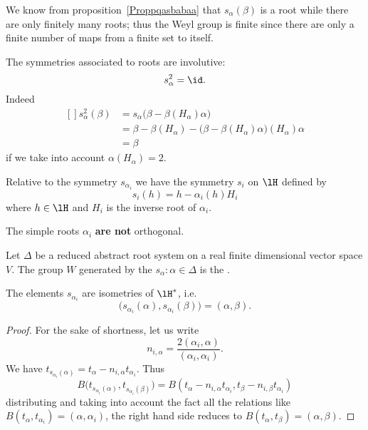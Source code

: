We know from proposition~\ref{Proppqasbabaa} that \( s_{\alpha}(\beta)\) is a root while there are only finitely many roots; thus the Weyl group is finite since there are only a finite number of maps from a finite set to itself.

The symmetries associated to roots are involutive:
\begin{equation}
	s_{\alpha}^2=\id.
\end{equation}
Indeed
\begin{equation}
	\begin{aligned}[]
		s^2_{\alpha}(\beta) & =s_{\alpha}\big( \beta-\beta(H_{\alpha})\alpha \big)                                 \\
		                    & =\beta-\beta(H_{\alpha})-\big( \beta-\beta(H_{\alpha})\alpha \big)(H_{\alpha})\alpha \\
		                    & =\beta
	\end{aligned}
\end{equation}
if we take into account \( \alpha(H_{\alpha})=2\).

Relative to the symmetry \( s_{\alpha_i}\) we have the symmetry \( s_i\) on \( \lH\) defined by
\begin{equation}        \label{EqSymsiReltosalphai}
	s_i(h)=h-\alpha_i(h)H_i
\end{equation}
where \( h\in\lH\) and \( H_i\) is the inverse root of \( \alpha_i\).

\begin{remark}
	The simple roots \( \alpha_i\) {\bf are not} orthogonal.
\end{remark}

Let $\Delta$ be a reduced abstract root system on a real finite dimensional vector space $V$. The group $W$ generated by the $s_{\alpha}:\alpha\in\Delta$ is the .

\begin{proposition}     \label{PropWeylIsomalphai}
	The elements \( s_{\alpha_i}\) are isometries of \( \lH^*\), i.e.
	\begin{equation}
		\big( s_{\alpha_i}(\alpha),s_{\alpha_i}(\beta) \big)=(\alpha,\beta).
	\end{equation}
\end{proposition}

\begin{proof}
	For the sake of shortness, let us write
	\begin{equation}
		n_{i,\alpha}=\frac{ 2(\alpha_i,\alpha) }{ (\alpha_i,\alpha_i) }.
	\end{equation}
	We have \( t_{s_{\alpha_i}(\alpha)}=t_{\alpha}-n_{i,\alpha}t_{\alpha_i}\). Thus
	\begin{equation}
		B\big( t_{s_{\alpha_i}(\alpha)}, t_{s_{\alpha_i}(\beta)} \big)=B(t_{\alpha}-n_{i,\alpha}t_{\alpha_i},t_{\beta}-n_{i,\beta}t_{\alpha_i})
	\end{equation}
	distributing and taking into account the fact all the relations like \( B(t_{\alpha},t_{\alpha_i})=(\alpha,\alpha_i)\), the right hand side reduces to \( B(t_{\alpha},t_{\beta})=(\alpha,\beta)\).
\end{proof}

